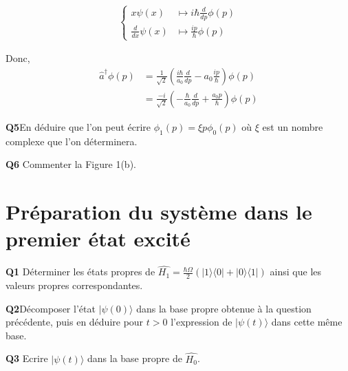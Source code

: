 \documentclass[french]{article}
\begin{document}
	\begin{align}
		\begin{cases}
			x \psi(x) &\mapsto i\hbar \frac{d}{dp}\phi(p)\\
			\frac{d}{dx} \psi(x) &\mapsto \frac{ip}{\hbar} \phi(p)
		\end{cases}
	\end{align}
	
	Donc,
	\begin{align}
		\hat{a}^\dag \phi(p) &= \frac{1}{\sqrt{2}} \left(\frac{i\hbar}{a_0}\frac{d}{dp} - a_0\frac{ip}{\hbar}\right) \phi(p)\\
		&= \frac{-i}{\sqrt{2}} \left(-\frac{\hbar}{a_0}\frac{d}{dp} + \frac{a_0p}{\hbar}\right) \phi(p)
	\end{align}

	\begin{tcolorbox}[colback=gray!5!white,colframe=gray!75!black]
		\textbf{\large{Q5}}En déduire que l'on peut écrire $\phi_1(p) = \xi p \phi_0(p)$ où $\xi$ est un nombre complexe que l'on déterminera. 
	\end{tcolorbox}


	\begin{tcolorbox}[colback=gray!5!white,colframe=gray!75!black]
		\textbf{\large{Q6}} Commenter la Figure 1(b).
	\end{tcolorbox}

	\section{Préparation du système dans le premier état excité}

	\begin{tcolorbox}[colback=gray!5!white,colframe=gray!75!black]
		\textbf{\large{Q1}} Déterminer les états propres de $\hat{H_1} = \frac{\hbar \Omega}{2} \left(|1\rangle \langle 0| + |0\rangle \langle 1| \right)$  ainsi que les valeurs propres correspondantes.
	\end{tcolorbox}

	\begin{tcolorbox}[colback=gray!5!white,colframe=gray!75!black]
		\textbf{\large{Q2}}Décomposer l'état $|\psi(0)\rangle$ dans la base propre obtenue à la question précédente, puis en déduire pour $t > 0$ l'expression de $|\psi(t)\rangle$ dans cette même base.
	\end{tcolorbox}

	\begin{tcolorbox}[colback=gray!5!white,colframe=gray!75!black]
		\textbf{\large{Q3}} Ecrire  $|\psi(t)\rangle$ dans la base propre de $\hat{H_0}$.
	\end{tcolorbox}
\end{document}

